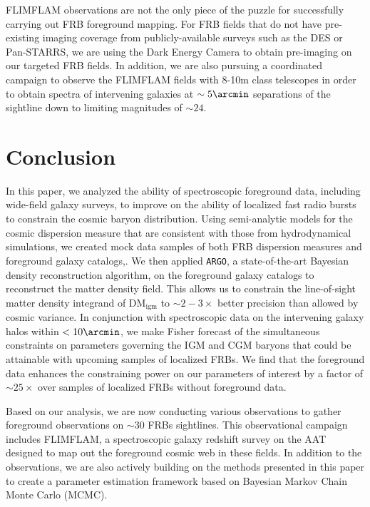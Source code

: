 \documentclass[twocolumn]{aastex63}
\newcommand{\dmigm}{\ensuremath{\mathrm{DM}_\mathrm{igm}}}
\newcommand{\argo}{\texttt{ARGO}}
\begin{document}
\begin{CJK*}{UTF8}{gbsn}
FLIMFLAM observations are not the only piece of the puzzle for successfully carrying out FRB foreground mapping. 
For FRB fields that do not have pre-existing imaging coverage from publicly-available surveys such as the DES or Pan-STARRS, 
we are using the Dark Energy Camera to obtain pre-imaging on our targeted FRB fields. 
In addition, we are also pursuing a coordinated
 campaign to observe the FLIMFLAM fields with 8-10m class telescopes in order to obtain spectra of intervening galaxies at $\sim 5\arcmin$ separations of the sightline
 down to limiting magnitudes of $\sim 24$.

\section{Conclusion}
In this paper, we analyzed the ability of spectroscopic foreground data, including wide-field galaxy surveys, to improve on the ability of localized 
fast radio bursts to constrain the cosmic baryon distribution. Using semi-analytic models for the cosmic dispersion measure that are consistent with
those from hydrodynamical simulations, we created mock data samples of both FRB dispersion measures and foreground galaxy catalogs,.
We then applied \argo{}, a state-of-the-art Bayesian density reconstruction algorithm, on the foreground galaxy catalogs to reconstruct the matter density
field. This allows us to constrain the line-of-sight matter density integrand of \dmigm{} to $\sim 2-3\times$ better precision than allowed by cosmic variance. In conjunction with spectroscopic data on the intervening galaxy halos within $<10\arcmin$, we make Fisher
forecast of the simultaneous constraints on parameters governing the IGM and CGM baryons that could be attainable with upcoming
samples of localized FRBs. We find that the foreground data enhances the constraining power
on our parameters of interest by a factor of $\sim 25\times$ over samples of localized FRBs
without foreground data.

Based on our analysis, we are now conducting various observations to gather foreground
observations on $\sim 30$ FRBs sightlines. This observational campaign includes FLIMFLAM, a spectroscopic galaxy redshift survey on the AAT 
designed to map out the foreground cosmic web in these fields. In addition to the observations, we are also actively building on the methods presented in
this paper to create a parameter 
estimation framework based on Bayesian Markov Chain Monte Carlo (MCMC).


\end{CJK*}
\end{document}
